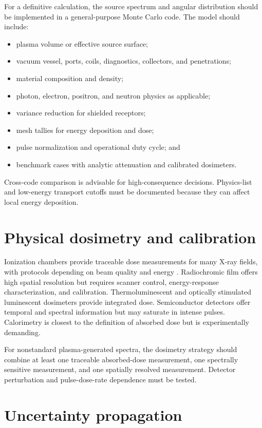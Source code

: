 For a definitive calculation, the source spectrum and angular distribution should be implemented in a general-purpose Monte Carlo code. The model should include:
\begin{itemize}
\item plasma volume or effective source surface;
\item vacuum vessel, ports, coils, diagnostics, collectors, and penetrations;
\item material composition and density;
\item photon, electron, positron, and neutron physics as applicable;
\item variance reduction for shielded receptors;
\item mesh tallies for energy deposition and dose;
\item pulse normalization and operational duty cycle; and
\item benchmark cases with analytic attenuation and calibrated dosimeters.
\end{itemize}
Cross-code comparison is advisable for high-consequence decisions. Physics-list and low-energy transport cutoffs must be documented because they can affect local energy deposition.

\section{Physical dosimetry and calibration}

Ionization chambers provide traceable dose measurements for many X-ray fields, with protocols depending on beam quality and energy \cite{iaea398,ma2001}. Radiochromic film offers high spatial resolution but requires scanner control, energy-response characterization, and calibration. Thermoluminescent and optically stimulated luminescent dosimeters provide integrated dose. Semiconductor detectors offer temporal and spectral information but may saturate in intense pulses. Calorimetry is closest to the definition of absorbed dose but is experimentally demanding.

For nonstandard plasma-generated spectra, the dosimetry strategy should combine at least one traceable absorbed-dose measurement, one spectrally sensitive measurement, and one spatially resolved measurement. Detector perturbation and pulse-dose-rate dependence must be tested.

\section{Uncertainty propagation}

